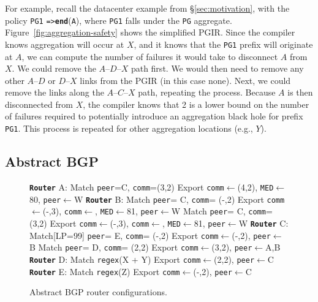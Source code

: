 \documentclass[10pt]{sigalternate052015}
\newcommand{\CD}[1]{\texttt{\small #1}}  %
\newcommand{\KW}[1]{\texttt{\small\bfseries{#1}}}
\newcommand{\Path}{\texttt{=>}}
\newcommand{\End}{\KW{end}}
\begin{document}
For example, recall the datacenter example from \S\ref{sec:motivation}, with the policy
\CD{PG1} \Path \text{ }\End(\CD{A}), where \CD{PG1} falls under the \CD{PG} aggregate. Figure~\ref{fig:aggregation-safety} shows the simplified PGIR. Since the compiler knows aggregation will occur at $X$, and it knows that the \CD{PG1} prefix will originate at $A$, we can compute the number of failures it would take to disconnect $A$ from $X$. We could remove the $A$--$D$--$X$ path first. We would then need to remove any other $A$--$D$ or $D$--$X$ links from the PGIR (in this case none). Next, we could remove the links along the $A$--$C$--$X$ path, repeating the process. Because $A$ is then disconnected from $X$, the compiler knows that 2 is a lower bound on the number of failures required to potentially introduce an aggregation black hole for prefix \CD{PG1}. This process is repeated for other aggregation locations (e.g., $Y$).


\subsection{Abstract BGP}
\label{sec:abgp}



\newcommand{\highlight}[1]{%
  \colorbox{red!50}{$\displaystyle#1$}}
\newcommand{\Router}[1]{\KW{Router} #1:}
\newcommand{\REGEX}[1]{\texttt{regex}(#1)}
\newcommand{\PEER}{\texttt{peer}}
\newcommand{\COMM}{\texttt{comm}}
\newcommand{\MED}{\texttt{MED}}
\newcommand{\Arrow}{\ensuremath{\leftarrow}}

\begin{figure}[t!]
\begin{code}
  \Router{A}
    Match \PEER=C, \COMM=(3,2)
      Export \COMM \Arrow (4,2),
             \MED \Arrow 80, \PEER \Arrow W
  \Router{B}
    Match \PEER = C, \COMM = (-,2)
      Export \COMM \Arrow (-,3), \COMM \Arrow {},
             \MED \Arrow 81, \PEER \Arrow W
    Match \PEER = C, \COMM = (3,2)
      Export \COMM \Arrow (-,3), \COMM \Arrow {},
             \MED \Arrow 81, \PEER \Arrow W
  \Router{C}
    Match[LP=99] \PEER = E, \COMM = (-,2)
      Export \COMM \Arrow (-,2), \PEER \Arrow B
    Match \PEER = D, \COMM = (2,2)
      Export \COMM \Arrow (3,2), \PEER \Arrow A,B
  \Router{D}
    Match \REGEX{X + Y}
      Export \COMM \Arrow (2,2), \PEER \Arrow C
  \Router{E}
    Match \REGEX{Z}
      Export \COMM \Arrow (-,2), \PEER \Arrow C
  \end{code}
  \vspace{-2em}
  \caption{Abstract BGP router configurations. \label{fig:abgp-config}}
  \vspace{-1em}
\end{figure}
\end{document}
